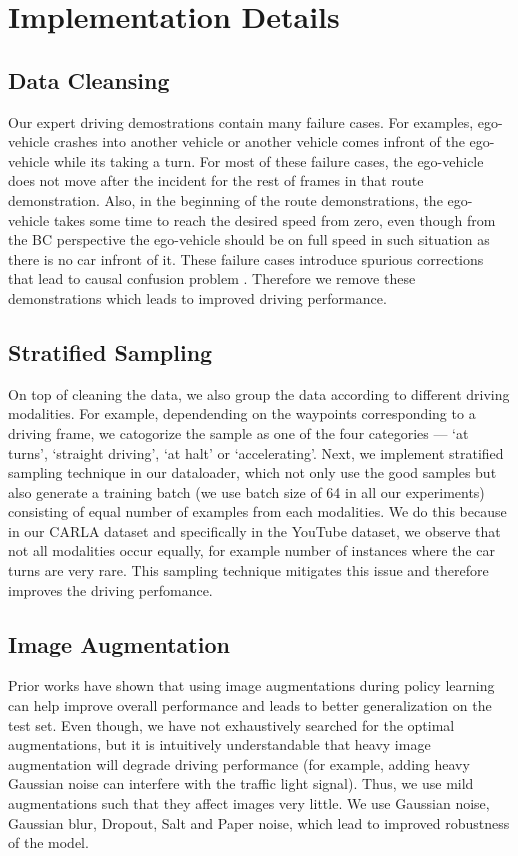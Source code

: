 \documentclass[letterpaper, 12pt]{book}
\theoremstyle{definition}
\theoremstyle{definition}
\theoremstyle{definition}
\theoremstyle{definition}
\theoremstyle{definition}
\begin{document}
\section{Implementation Details}
\label{sec:org19dc63b}
\subsection{Data Cleansing}
\label{sec:orga194301}
Our expert driving demostrations contain many failure cases. For examples,
ego-vehicle crashes into another vehicle or another vehicle comes infront of the
ego-vehicle while its taking a turn. For most of these failure cases, the
ego-vehicle does not move after the incident for the rest of frames in that
route demonstration. Also, in the beginning of the route demonstrations, the
ego-vehicle takes some time to reach the desired speed from zero, even though
from the BC perspective the ego-vehicle should be on full speed in such
situation as there is no car infront of it. These failure cases introduce
spurious corrections that lead to causal confusion problem
\cite{Codevilla2019}. Therefore we remove these demonstrations which leads to
improved driving performance.

\subsection{Stratified Sampling}
\label{sec:org22b8f13}
On top of cleaning the data, we also group the data according to different
driving modalities. For example, dependending on the waypoints corresponding to
a driving frame, we catogorize the sample as one of the four categories --- `at
turns', `straight driving', `at halt' or `accelerating'. Next, we implement
stratified sampling technique in our dataloader, which not only use the good
samples but also generate a training batch (we use batch size of 64 in all our
experiments) consisting of equal number of examples from each modalities. We do
this because in our CARLA dataset and specifically in the YouTube dataset, we
observe that not all modalities occur equally, for example number of instances
where the car turns are very rare. This sampling technique mitigates this issue
and therefore improves the driving perfomance.

\subsection{Image Augmentation}
\label{sec:orgfd37c03}
Prior works \cite{Laskin2020,Kostrikov2020,Yarats2021,Mezghani2021} have shown
that using image augmentations during policy learning can help improve overall
performance and leads to better generalization on the test set. Even though, we
have not exhaustively searched for the optimal augmentations, but it is
intuitively understandable that heavy image augmentation will degrade driving
performance (for example, adding heavy Gaussian noise can interfere with the
traffic light signal). Thus, we use mild augmentations such that they affect
images very little. We use Gaussian noise, Gaussian blur, Dropout, Salt and
Paper noise, which lead to improved robustness of the model.
\end{document}
